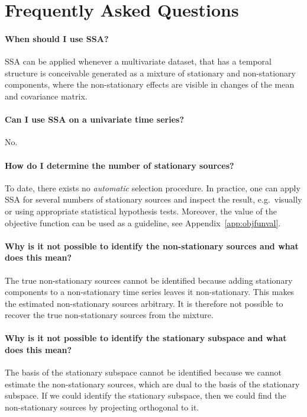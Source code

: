 \documentclass{article}
\newcommand{\1}{\ensuremath{\mathds{1}}}
\newcommand{\0}{\ensuremath{0}}
\begin{document}
\section{Frequently Asked Questions}
\label{sec:faq}

\paragraph{When should I use SSA?} 
SSA can be applied whenever a multivariate dataset, that has a temporal structure is conceivable 
generated as a mixture of stationary and non-stationary components, where the non-stationary 
effects are visible in changes of the mean and covariance matrix. 

\paragraph{Can I use SSA on a univariate time series?} No. 

\paragraph{How do I determine the number of stationary sources?} To date, there exists no \textit{automatic}
selection procedure. In practice, one can apply SSA for several numbers of stationary sources and inspect
the result, e.g.~visually or using appropriate statistical hypothesis tests. Moreover, the value of the 
objective function can be used as a guideline, see Appendix~\ref{app:objfunval}.

\paragraph{Why is it not possible to identify the non-stationary sources and what does this mean?} 
The true non-stationary sources cannot be identified because adding stationary components to a 
non-stationary time series leaves it non-stationary. This makes the estimated non-stationary sources 
arbitrary. It is therefore not possible to recover the true non-stationary sources from the mixture. 
	
\paragraph{Why is it not possible to identify the stationary subspace and what does this mean?} The basis
of the stationary subspace cannot be identified because we cannot estimate the non-stationary sources, which
are dual to the basis of the stationary subspace. If we could identify the stationary subspace, then we could
find the non-stationary sources by projecting orthogonal to it.
\end{document}
